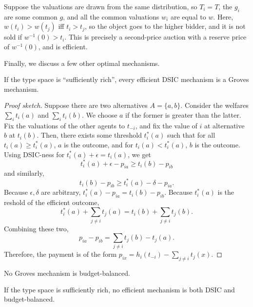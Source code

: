 		\begin{fex}
			Suppose the valuations are drawn from the same distribution, so $T_i = T$, the $g_i$ are some common $g$, and all the common valuations $w_i$ are equal to $w$. Here, $w(t_i) > w(t_j)$ iff $t_i > t_j$, so the object goes to the higher bidder, and it is not sold if $w^{-1}(0) > t_i$. This is precisely a second-price auction with a reserve price of $w^{-1}(0)$, and is efficient. 
		\end{fex}

		Finally, we discuss a few other optimal mechanisms.

		\begin{ftheo}
			If the type space is ``sufficiently rich'', every efficient DSIC mechanism is a Groves mechanism.
		\end{ftheo}
		\begin{proof}[Proof sketch]
			Suppose there are two alternatives $A = \{a,b\}$. Consider the welfares $\sum_i t_i(a)$ and $\sum_i t_i(b)$. We choose $a$ if the former is greater than the latter. Fix the valuations of the other agents to $t_{-i}$, and fix the value of $i$ at alternative $b$ at $t_i(b)$. Then, there exists some threshold $t_i^*(a)$ such that for all $t_i(a) \ge t_i^*(a)$, $a$ is the outcome, and for $t_i(a) < t_i^*(a)$, $b$ is the outcome.\\
			Using DSIC-ness for $t_i^*(a) + \epsilon = t_i(a)$, we get
			\[ t_i^*(a) + \epsilon - p_{ia} \ge t_i(b) - p_{ib} \]
			and similarly,
			\[ t_i(b) - p_{ib} \ge t_i^*(a) - \delta - p_{ia}. \]
			Because $\epsilon,\delta$ are arbitrary, $t_i^*(a) - p_{ia} = t_i(b) - p_{ib}$. Because $t_i^*(a)$ is the reshold of the efficient outcome,
			\[ t_i^*(a) + \sum_{j \ne i} t_j(a) = t_i(b) + \sum_{j \ne i} t_j(b). \]
			Combining these two,
			\[ p_{ia} - p_{ib} = \sum_{j \ne i} t_j(b) - t_j(a). \]
			Therefore, the payment is of the form $p_{ix} = h_i(t_{-i}) - \sum_{j \ne i} t_j(x)$.
		\end{proof}

		\begin{ftheo}
			No Groves mechanism is budget-balanced.
		\end{ftheo}

		\begin{fcor}
			If the type space is sufficiently rich, no efficient mechanism is both DSIC and budget-balanced. 
		\end{fcor}

